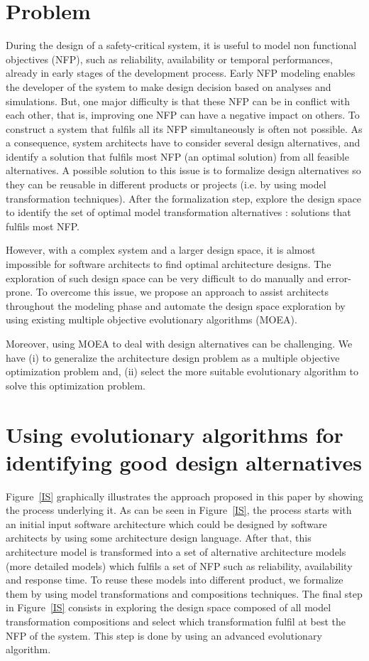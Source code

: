 \documentclass[conference]{IEEEtran}
\begin{document}
\section{Problem}
\label{Problem}
During the design of a safety-critical system, it is useful to model non functional objectives (NFP), such as reliability, availability or temporal performances, already in early stages of the development process. Early NFP modeling enables the developer of the system to make design decision based on analyses and simulations. But, one major difficulty is that these NFP can be in conflict with each other, that is, improving one NFP can have a negative impact on others. To construct a system that fulfils all its NFP simultaneously is often not possible. As a consequence, system architects have to consider several design alternatives, and identify a solution that fulfils most NFP (an optimal solution) from all feasible alternatives. A possible solution to this issue is to formalize design alternatives so they can be reusable in different products or projects (i.e. by using model transformation techniques). After the formalization step, explore the design space to identify the set of optimal model transformation alternatives : solutions that fulfils most NFP.

However, with a complex system and a larger design space, it is almost impossible for software architects to find optimal architecture designs. The exploration of such design space can be very difficult to do manually and error-prone. To overcome this issue, we propose an approach to assist architects throughout the modeling phase and automate the design space exploration by using existing multiple objective evolutionary algorithms (MOEA).

Moreover, using MOEA to deal with design alternatives can be challenging. We have (i) to generalize the architecture design problem as a multiple objective optimization problem and, (ii) select the more suitable evolutionary algorithm to solve this optimization problem.

\section{Using evolutionary algorithms for identifying good design alternatives}
\label{Approach}
Figure~\ref{IS} graphically illustrates the approach proposed in this paper by showing the process underlying it. As can be seen in Figure~\ref{IS}, the process starts with an initial input software architecture which could be designed by software architects by using some architecture design language\cite{Medvidovic}. After that, this architecture model is transformed into a set of alternative architecture models (more detailed models) which fulfils a set of NFP such as reliability, availability and response time. To reuse these models into different product, we formalize them by using model transformations and compositions techniques. The final step in Figure~\ref{IS} consists in exploring the design space composed of all model transformation compositions and select which transformation fulfil at best the NFP of the system. This step is done by using an advanced evolutionary algorithm.
\end{document}
